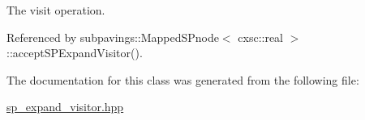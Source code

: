 \-The visit operation. 



\-Referenced by subpavings\-::\-Mapped\-S\-Pnode$<$ cxsc\-::real $>$\-::accept\-S\-P\-Expand\-Visitor().



\-The documentation for this class was generated from the following file\-:\begin{DoxyCompactItemize}
\item 
\hyperlink{sp__expand__visitor_8hpp}{sp\-\_\-expand\-\_\-visitor.\-hpp}\end{DoxyCompactItemize}
